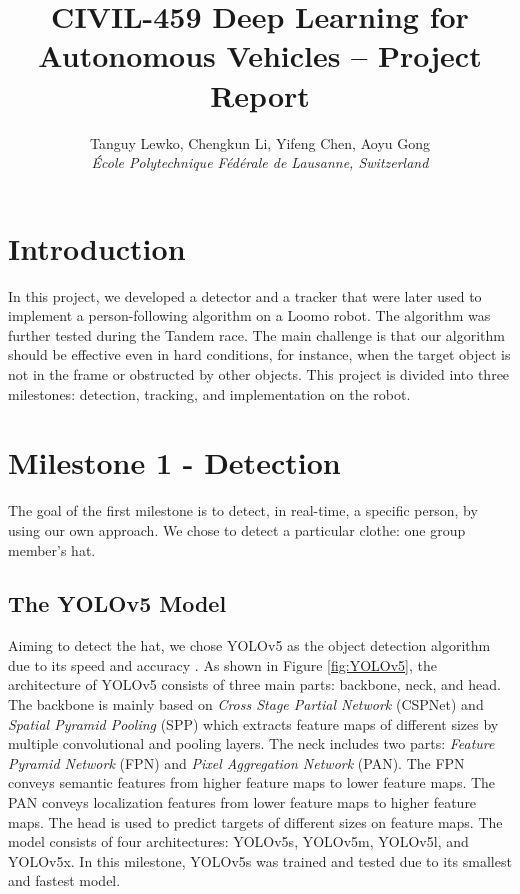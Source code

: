 \documentclass[10pt,conference,compsocconf]{IEEEtran}
\begin{document}
\title{CIVIL-459 Deep Learning for Autonomous Vehicles -- Project Report}

\author{
  Tanguy Lewko, Chengkun Li, Yifeng Chen, Aoyu Gong\\
  \textit{\'Ecole Polytechnique F\'ed\'erale de Lausanne, Switzerland}
}

\maketitle

\section{Introduction} \label{sec:Introduction}
In this project, we developed a detector and a tracker that were later used to implement a person-following algorithm on a Loomo robot. The algorithm was further tested during the Tandem race. The main challenge is that our algorithm should be effective even in hard conditions, for instance, when the target object is not in the frame or obstructed by other objects. This project is divided into three milestones: detection, tracking, and implementation on the robot.


\section{Milestone 1 - Detection}
The goal of the first milestone is to detect, in real-time, a specific person, by using our own approach. We chose to detect a particular clothe: one group member's hat.

\subsection{The YOLOv5 Model}
Aiming to detect the hat, we chose YOLOv5 as the object detection algorithm due to its speed and accuracy \cite{YOLOv5doc}.
As shown in Figure \ref{fig:YOLOv5}, the architecture of YOLOv5 consists of three main parts: backbone, neck, and head.
The backbone is mainly based on \emph{Cross Stage Partial Network} (CSPNet) and \emph{Spatial Pyramid Pooling} (SPP) which extracts feature maps of different sizes by multiple convolutional and pooling layers.
The neck includes two parts: \emph{Feature Pyramid Network} (FPN) and \emph{Pixel Aggregation Network} (PAN).
The FPN conveys semantic features from higher feature maps to lower feature maps.
The PAN conveys localization features from lower feature maps to higher feature maps.
The head is used to predict targets of different sizes on feature maps.
The model consists of four architectures: YOLOv5s, YOLOv5m, YOLOv5l, and YOLOv5x.
In this milestone, YOLOv5s was trained and tested due to its smallest and fastest model.
\end{document}

